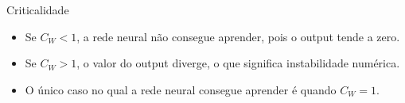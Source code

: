 \documentclass{beamer}
\newcommand{\EE}{\mathbb{E}}
\DeclareMathOperator{\Cov}{Cov}
\newcommand{\aaA}{\alpha}
\newcommand{\aaB}{\beta}
\begin{document}
\begin{frame}{Criticalidade}
	\begin{itemize}
		\item Se $C_W < 1$, a rede neural não consegue aprender, pois o output tende a zero.
		\item Se $C_W > 1$, o valor do output diverge, o que significa instabilidade numérica.
		\item O único caso no qual a rede neural consegue aprender é quando $C_W = 1$.
	\end{itemize}
\end{frame}

	
	
\end{document}
